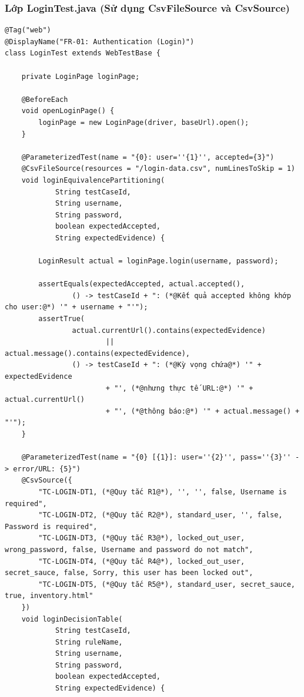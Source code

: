 \documentclass[a4paper]{article}
\begin{document}
\subsubsection{Lớp LoginTest.java (Sử dụng CsvFileSource và CsvSource)}
\begin{lstlisting}[caption={Trích đoạn mã nguồn lớp LoginTest.java}]
@Tag("web")
@DisplayName("FR-01: Authentication (Login)")
class LoginTest extends WebTestBase {

    private LoginPage loginPage;

    @BeforeEach
    void openLoginPage() {
        loginPage = new LoginPage(driver, baseUrl).open();
    }

    @ParameterizedTest(name = "{0}: user=''{1}'', accepted={3}")
    @CsvFileSource(resources = "/login-data.csv", numLinesToSkip = 1)
    void loginEquivalencePartitioning(
            String testCaseId,
            String username,
            String password,
            boolean expectedAccepted,
            String expectedEvidence) {

        LoginResult actual = loginPage.login(username, password);

        assertEquals(expectedAccepted, actual.accepted(),
                () -> testCaseId + ": (*@Kết quả accepted không khớp cho user:@*) '" + username + "'");
        assertTrue(
                actual.currentUrl().contains(expectedEvidence)
                        || actual.message().contains(expectedEvidence),
                () -> testCaseId + ": (*@Kỳ vọng chứa@*) '" + expectedEvidence
                        + "', (*@nhưng thực tế URL:@*) '" + actual.currentUrl()
                        + "', (*@thông báo:@*) '" + actual.message() + "'");
    }

    @ParameterizedTest(name = "{0} [{1}]: user=''{2}'', pass=''{3}'' -> error/URL: {5}")
    @CsvSource({
        "TC-LOGIN-DT1, (*@Quy tắc R1@*), '', '', false, Username is required",
        "TC-LOGIN-DT2, (*@Quy tắc R2@*), standard_user, '', false, Password is required",
        "TC-LOGIN-DT3, (*@Quy tắc R3@*), locked_out_user, wrong_password, false, Username and password do not match",
        "TC-LOGIN-DT4, (*@Quy tắc R4@*), locked_out_user, secret_sauce, false, Sorry, this user has been locked out",
        "TC-LOGIN-DT5, (*@Quy tắc R5@*), standard_user, secret_sauce, true, inventory.html"
    })
    void loginDecisionTable(
            String testCaseId,
            String ruleName,
            String username,
            String password,
            boolean expectedAccepted,
            String expectedEvidence) {


\end{lstlisting}
\end{document}
